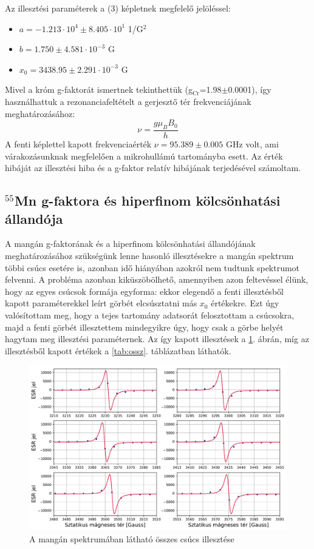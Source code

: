 \documentclass[12pt,a4paper]{article}
\begin{document}
\newline
Az illesztési paraméterek a (3) képletnek megfelelő jelöléssel:
\begin{itemize}
\item{$a=-1.213 \cdot 10^{4} \pm 8.405 \cdot 10^{1}$ 1/G$^2$}
\item{$b=1.750 \pm 4.581 \cdot 10^{-3}$ G}
\item{$x_0=3438.95 \pm 2.291 \cdot 10^{-3}$ G}
\end{itemize}
Mivel a króm g-faktorát ismertnek tekinthettük (g$_{\textrm{Cr}}$=1.98$\pm$0.0001), így használhattuk a rezonanciafeltételt a gerjesztő tér frekvenciájának meghatározásához:
\begin{equation}
\nu = \frac{g\mu_B B_0}{h}
\end{equation}
A fenti képlettel kapott frekvenciaérték $\nu=95.389 \pm 0.005$ GHz volt, ami várakozásunknak megfelelően a mikrohullámú tartományba esett. Az érték hibáját az illesztési hiba és a g-faktor relatív hibájának terjedésével számoltam. \\
\newpage
\subsection{$^{55}$Mn g-faktora és hiperfinom kölcsönhatási állandója}
A mangán g-faktorának és a hiperfinom kölcsönhatási állandójának meghatározásához szükségünk lenne hasonló illesztésekre a mangán spektrum többi csúcs esetére is, azonban idő hiányában azokról nem tudtunk spektrumot felvenni. A probléma azonban kiküszöbölhető, amennyiben azon feltevéssel élünk, hogy az egyes csúcsok formája egyforma: ekkor elegendő a fenti illesztésből kapott paraméterekkel leírt görbét elcsúsztatni más $x_0$ értékekre. Ezt úgy valósítottam meg, hogy a tejes tartomány adatsorát felosztottam a csúcsokra, majd a fenti görbét illesztettem mindegyikre úgy, hogy csak a görbe helyét hagytam meg illesztési paraméternek. Az így kapott illesztések a \ref{fig:mn_ossz}. ábrán, míg az illesztésből kapott értékek a  \ref{tab:ossz}. táblázatban láthatók.\\

\begin{figure}[!h]
\centering
\includegraphics[scale=0.55]{mang_teljes_fits}
\caption{A mangán spektrumában látható összes csúcs illesztése}
\label{fig:mn_ossz}
\end{figure}
\end{document}
